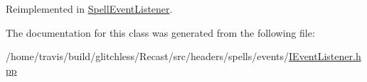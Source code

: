 Reimplemented in \hyperlink{class_spell_event_listener_a932a0a7b25fc732ebd796244370162e7}{Spell\-Event\-Listener}.



The documentation for this class was generated from the following file\-:\begin{DoxyCompactItemize}
\item 
/home/travis/build/glitchless/\-Recast/src/headers/spells/events/\hyperlink{_i_event_listener_8hpp}{I\-Event\-Listener.\-hpp}\end{DoxyCompactItemize}
